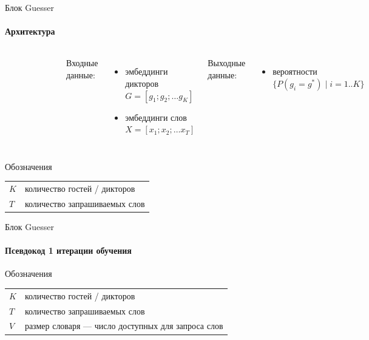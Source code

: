 \documentclass[aspectratio=169]{beamer}
\begin{document}
\begin{frame}{Блок Guesser}
\framesubtitle{Архитектура}
    \begin{columns}
 
    \begin{figure}[bht]
    \includegraphics[width=.8\textwidth]{guesser.png}
    \end{figure}

    Входные данные:
    \begin{itemize}
        \item эмбеддинги дикторов\\
            $G = [g_1; g_2; \ldots g_K]$
        \item эмбеддинги слов\\
            $X = [x_1; x_2; \ldots x_T]$
    \end{itemize}
    Выходные данные:
    \begin{itemize}
        \item вероятности
            $\{P(g_i = g^*) \;|\; i=1..K\}$
    \end{itemize}
    \end{columns}

    \begin{block}{Обозначения}
    \begin{tabular}{l l}
        $K$ & количество гостей / дикторов\\
        $T$ & количество запрашиваемых слов
    \end{tabular}
    \end{block}
\end{frame}

\begin{frame}[fragile]{Блок Guesser}
\framesubtitle{Псевдокод 1 итерации обучения}

    \begin{block}{Обозначения}
    \begin{tabular}{l l}
        $K$ & количество гостей / дикторов\\
        $T$ & количество запрашиваемых слов\\
        $V$ & размер словаря --- число доступных для запроса слов
    \end{tabular}
    \end{block}
\end{frame}
\end{document}
